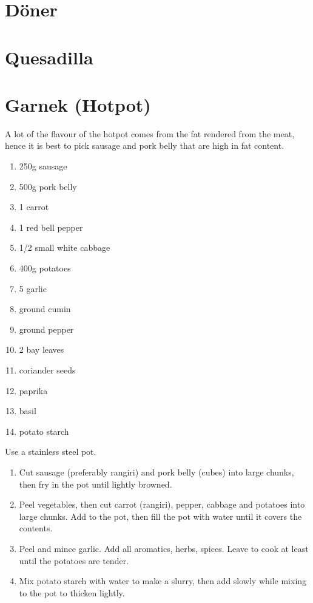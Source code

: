 \section{Döner}
\section{Quesadilla}

\section{Garnek (Hotpot)}
A lot of the flavour of the hotpot comes from the fat rendered from the meat,
hence it is best to pick sausage and pork belly that are high in fat content.

\begin{enumerate}
  \item 250g sausage
  \item 500g pork belly
  \item 1 carrot
  \item 1 red bell pepper
  \item 1/2 small white cabbage
  \item 400g potatoes
  \item 5 garlic
  \item ground cumin
  \item ground pepper
  \item 2 bay leaves
  \item coriander seeds
  \item paprika
  \item basil
  \item potato starch
\end{enumerate}

Use a stainless steel pot.

\begin{enumerate}
  \item Cut sausage (preferably rangiri) and pork belly (cubes) into large
  chunks, then fry in the pot until lightly browned.
  \item Peel vegetables, then cut carrot (rangiri), pepper, cabbage and
  potatoes into large chunks. Add to the pot, then fill the pot with water
  until it covers the contents.
  \item Peel and mince garlic. Add all aromatics, herbs, spices. Leave to cook
  at least until the potatoes are tender.
  \item Mix potato starch with water to make a slurry, then add slowly while
  mixing to the pot to thicken lightly.
\end{enumerate}
